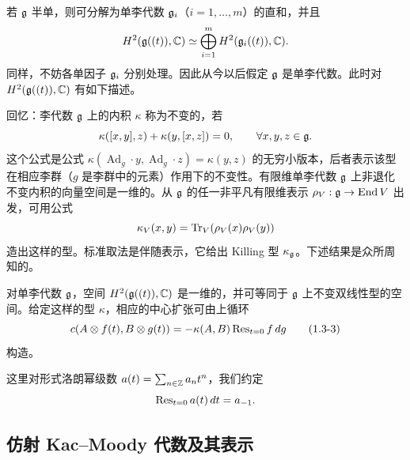 若 $\mathfrak{g}$ 半单，则可分解为单李代数 $\mathfrak{g}_i$（$i=1,\dots,m$）的直和，并且
\[
    H^2(\mathfrak{g}((t)),\mathbb{C})\simeq\bigoplus_{i=1}^{m}H^2(\mathfrak{g}_i((t)),\mathbb{C}).
\]
同样，不妨各单因子 $\mathfrak{g}_i$ 分别处理。因此从今以后假定 $\mathfrak{g}$ 是单李代数。此时对 $H^2(\mathfrak{g}((t)),\mathbb{C})$ 有如下描述。

回忆：李代数 $\mathfrak{g}$ 上的内积 $\kappa$ 称为不变的，若
\[
    \kappa([x,y],z)+\kappa(y,[x,z])=0,\qquad \forall x,y,z\in\mathfrak{g}.
\]
这个公式是公式 $\kappa(\operatorname{Ad}_g\cdot y,\operatorname{Ad}_g\cdot z)=\kappa(y,z)$ 的无穷小版本，后者表示该型在相应李群（$g$ 是李群中的元素）作用下的不变性。有限维单李代数 $\mathfrak{g}$ 上非退化不变内积的向量空间是一维的。从 $\mathfrak{g}$ 的任一非平凡有限维表示 $\rho_V:\mathfrak{g}\to\operatorname{End} V$ 出发，可用公式
\[
    \kappa_V(x,y)=\operatorname{Tr}_V(\rho_V(x)\rho_V(y))
\]
造出这样的型。标准取法是伴随表示，它给出 Killing 型 $\kappa_{\mathfrak{g}}$。下述结果是众所周知的。

\begin{lemma}\label{lem:u02-h2}
    对单李代数 $\mathfrak{g}$，空间 $H^2(\mathfrak{g}((t)),\mathbb{C})$ 是一维的，并可等同于 $\mathfrak{g}$ 上不变双线性型的空间。给定这样的型 $\kappa$，相应的中心扩张可由上循环
    \begin{equation}
        c(A\otimes f(t),B\otimes g(t))=-\kappa(A,B)\operatorname{Res}_{t=0}f\,dg
        \tag{1.3-3}
    \end{equation}
    构造。
\end{lemma}

这里对形式洛朗幂级数 $a(t)=\sum_{n\in\mathbb{Z}}a_nt^n$，我们约定
\[
    \operatorname{Res}_{t=0}a(t)\,dt=a_{-1}.
\]

\subsection{仿射 Kac--Moody 代数及其表示}

